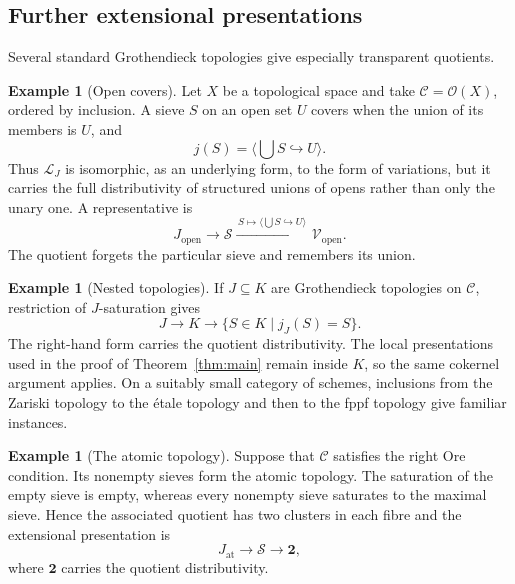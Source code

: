 \documentclass[12pt,oneside,reqno]{amsart}
\theoremstyle{definition}
\newtheorem{example}[theorem]{Example}
\theoremstyle{remark}
\newcommand{\C}{\mathcal C}
\newcommand{\Sieve}{\mathscr S}
\newcommand{\Var}{\mathscr V}
\newcommand{\prin}[1]{\langle #1\rangle}
\newcommand{\Sat}{\mathscr L}
\begin{document}
\subsection{Further extensional presentations}

Several standard Grothendieck topologies give especially transparent
quotients.

\begin{example}[Open covers]
Let \(X\) be a topological space and take
\(\C=\mathcal O(X)\), ordered by inclusion.  A sieve \(S\) on an open
set \(U\) covers when the union of its members is \(U\), and
\[
                  j(S)=\prin{\bigcup S\hookrightarrow U}.
\]
Thus \(\Sat_J\) is isomorphic, as an underlying form, to the form of
variations, but it carries the full distributivity of structured unions
of opens rather than only the unary one.  A representative is
\[
 J_{\mathrm{open}}\longrightarrow\Sieve
 \xrightarrow{\,S\mapsto\prin{\bigcup S\hookrightarrow U}\,}
 \Var_{\mathrm{open}}.
\]
The quotient forgets the particular sieve and remembers its union.
\end{example}

\begin{example}[Nested topologies]
If \(J\subseteq K\) are Grothendieck topologies on \(\C\), restriction
of \(J\)-saturation gives
\[
 J\longrightarrow K
 \longrightarrow\{S\in K\mid j_J(S)=S\}.
\]
The right-hand form carries the quotient distributivity.  The local
presentations used in the proof of Theorem~\ref{thm:main} remain inside
\(K\), so the same cokernel argument applies.  On a suitably small
category of schemes, inclusions from the Zariski topology to the
\'{e}tale topology and then to the fppf topology give familiar
instances.
\end{example}

\begin{example}[The atomic topology]
Suppose that \(\C\) satisfies the right Ore condition.  Its nonempty
sieves form the atomic topology.  The saturation of the empty sieve is
empty, whereas every nonempty sieve saturates to the maximal sieve.
Hence the associated quotient has two clusters in each fibre and the
extensional presentation is
\[
 J_{\mathrm{at}}\longrightarrow\Sieve
 \longrightarrow\mathbf2,
\]
where \(\mathbf2\) carries the quotient distributivity.
\end{example}
\end{document}
